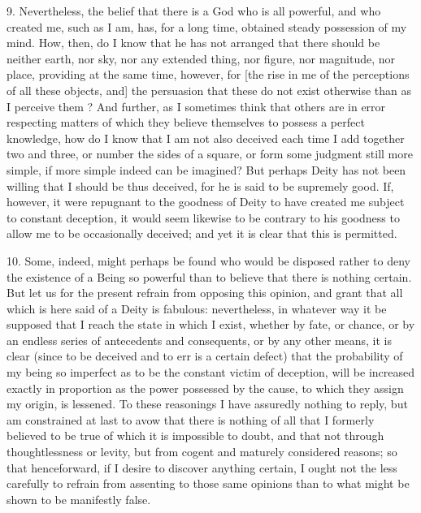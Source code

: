 9. Nevertheless, the belief that there is a God who is all powerful, and who created me, such as I am, has, for a long time, obtained steady possession of my mind. How, then, do I know that he has not arranged that there should be neither earth, nor sky, nor any extended thing, nor figure, nor magnitude, nor place, providing at the same time, however, for [the rise in me of the perceptions of all these objects, and] the persuasion that these do not exist otherwise than as I perceive them ? And further, as I sometimes think that others are in error respecting matters of which they believe themselves to possess a perfect knowledge, how do I know that I am not also deceived each time I add together two and three, or number the sides of a square, or form some judgment still more simple, if more simple indeed can be imagined? But perhaps Deity has not been willing that I should be thus deceived, for he is said to be supremely good. If, however, it were repugnant to the goodness of Deity to have created me subject to constant deception, it would seem likewise to be contrary to his goodness to allow me to be occasionally deceived; and yet it is clear that this is permitted.

10. Some, indeed, might perhaps be found who would be disposed rather to deny the existence of a Being so powerful than to believe that there is nothing certain. But let us for the present refrain from opposing this opinion, and grant that all which is here said of a Deity is fabulous: nevertheless, in whatever way it be supposed that I reach the state in which I exist, whether by fate, or chance, or by an endless series of antecedents and consequents, or by any other means, it is clear (since to be deceived and to err is a certain defect) that the probability of my being so imperfect as to be the constant victim of deception, will be increased exactly in proportion as the power possessed by the cause, to which they assign my origin, is lessened. To these reasonings I have assuredly nothing to reply, but am constrained at last to avow that there is nothing of all that I formerly believed to be true of which it is impossible to doubt, and that not through thoughtlessness or levity, but from cogent and maturely considered reasons; so that henceforward, if I desire to discover anything certain, I ought not the less carefully to refrain from assenting to those same opinions than to what might be shown to be manifestly false.

